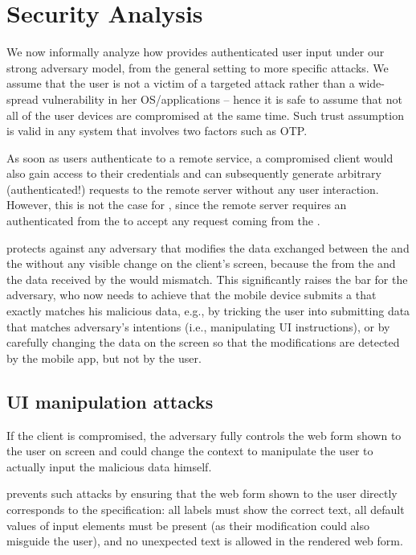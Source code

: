 \section{Security Analysis} 
\label{integriscreen:sec:securityAnalysis}

We now informally analyze how \sysname provides authenticated user input under our strong adversary model, from the general setting to more specific attacks.
We assume that the user is not a victim of a targeted attack rather than a wide-spread vulnerability in her OS/applications -- hence it is safe to assume that not all of the user devices are compromised at the same time. Such trust assumption is valid in any system that involves two factors such as OTP.

As soon as users authenticate to a remote service, a compromised client would also gain access to their credentials and can subsequently generate arbitrary (authenticated!) requests to the remote server without any user interaction.
However, this is not the case for \sysname, since the remote server requires an authenticated \POI from the \app to accept any request coming from the \client.


\sysname protects against any adversary that modifies the data exchanged between the \client and the \server without any visible change on the client's screen, because the \POI from the \app and the data received by the \server would mismatch.
This significantly raises the bar for the adversary, who now needs to achieve that the mobile device submits a \POI that exactly matches his malicious data, e.g.,  by tricking the user into submitting data that matches adversary's intentions (i.e., manipulating UI instructions), or by carefully changing the data on the screen so that the modifications are detected by the mobile app, but not by the user.


\subsection{UI manipulation attacks}

If the client is compromised, the adversary fully controls the web form shown to the user on screen and could change the context to manipulate the user to actually input the malicious data himself.

\name prevents such attacks by ensuring that the web form shown to the user directly corresponds to the specification: all labels must show the correct text, all default values of input elements must be present (as their modification could also misguide the user), and no unexpected text is allowed in the rendered web form.

